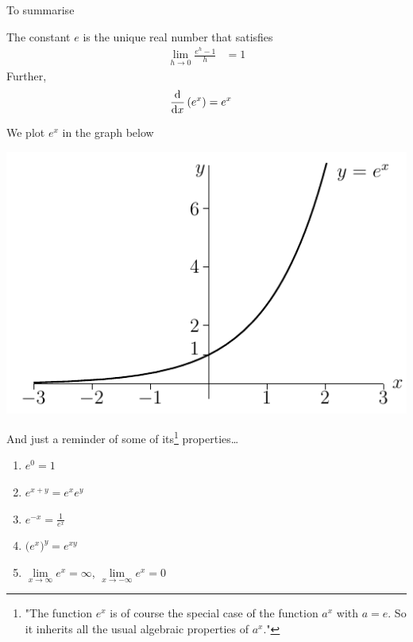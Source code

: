 To summarise
\begin{theorem}
The constant $e$ is the unique real number that satisfies
\begin{align*}
	\lim_{h \to 0} \frac{e^h-1}{h} &= 1
\end{align*}
Further,
\begin{align*}
	\bdiff{e^x}{x} &= e^x
\end{align*}
\end{theorem}
We plot $e^x$ in the graph below
\begin{fig}
\begin{center}
    \includegraphics{expGraph}
\end{center}
\end{fig}
And just a reminder of some of its\footnote{"The function $e^x$ is of course the special
case of the function $a^x$ with $a = e$. So it inherits all the usual algebraic properties
of $a^x$."} properties\dots
\begin{enumerate}
\item $e^0=1$
\item $e^{x+y}=e^xe^y$
\item $e^{-x}=\tfrac{1}{e^x}$
\item $\big(e^x\big)^y=e^{xy}$
\item $\lim\limits_{x\rightarrow\infty}e^x=\infty$,
           $\lim\limits_{x\rightarrow-\infty}e^x=0$
\end{enumerate}

